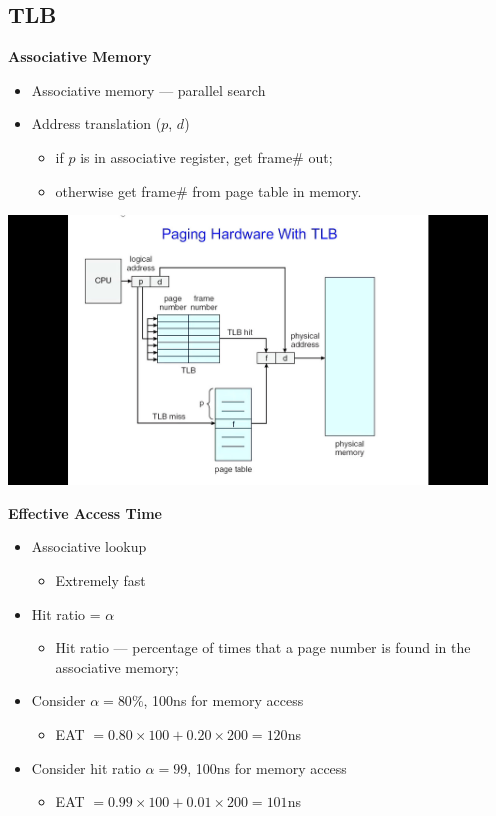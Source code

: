 \documentclass[11pt,a4paper]{article}
\begin{document}
\subsection{TLB}

\textbf{Associative Memory}
\begin{itemize}
    \item Associative memory --- parallel search
    \item Address translation ($p$, $d$)
        \begin{itemize}
            \item if $p$ is in associative register, get frame\# out;
            \item otherwise get frame\# from page table in memory.
        \end{itemize}
\end{itemize}

\includegraphics[height=270]{paging-hardware-with-tlb.jpg}

\textbf{Effective Access Time}
\begin{itemize}
    \item Associative lookup
        \begin{itemize}
            \item Extremely fast
        \end{itemize}
    \item Hit ratio = $\alpha$
        \begin{itemize}
            \item Hit ratio --- percentage of times that a page number is found in the
                associative memory;
        \end{itemize}
    \item Consider $\alpha = 80\%$, 100ns for memory access
        \begin{itemize}
            \item EAT $ = 0.80 \times 100 + 0.20 \times 200 = 120$ns
        \end{itemize}
    \item Consider hit ratio $\alpha = 99$, 100ns for memory access
        \begin{itemize}
            \item EAT $ = 0.99 \times 100 + 0.01 \times 200 = 101$ns
        \end{itemize}
\end{itemize}
\end{document}
